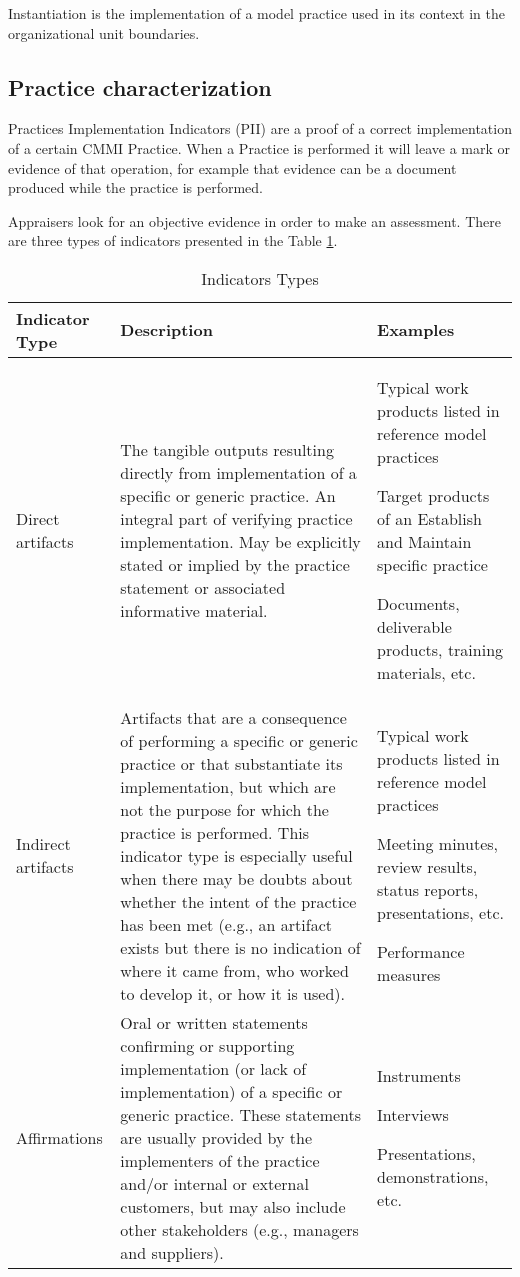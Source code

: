 Instantiation is the implementation of a model practice used in its context in the organizational unit boundaries.

\subsection{Practice characterization}
Practices Implementation Indicators (PII) are a proof of  a correct implementation of a certain CMMI Practice. When a Practice is performed it will leave a mark or evidence of that operation, for example that evidence can be a document produced while the practice is performed.

Appraisers look for an objective evidence in order to make an assessment. There are three types of indicators presented in the Table \ref{tab:Indicator}.


\begin{table}[h]
	\centering
	\caption{Indicators Types}
	\begin{tabular}{|p{2cm}|p{7cm}|p{4cm}|}
		\hline Indicator Type & Description & Examples\\
		\hline Direct artifacts & The tangible outputs resulting directly 
		from implementation of a specific or 
		generic practice. An integral part of 
		verifying practice implementation. May 
		be explicitly stated or implied by the 
		practice statement or associated 
		informative material. & Typical work products listed 
		in reference model practices 
		
		Target products of an 
		Establish and Maintain specific practice 
		
		Documents, deliverable 
		products, training materials, 
		etc. \\ 
		\hline Indirect artifacts & Artifacts that are a consequence of 
		performing a specific or generic practice 
		or that substantiate its implementation, 
		but which are not the purpose for which 
		the practice is performed. This indicator 
		type is especially useful when there may 
		be doubts about whether the intent of the 
		practice has been met (e.g., an artifact 
		exists but there is no indication of where 
		it came from, who worked to develop it, 
		or how it is used).  & Typical work products listed 
		in reference model practices 
		
		Meeting minutes, review 
		results, status reports, 
		presentations, etc. 
		
		Performance measures \\ 
		\hline Affirmations & Oral or written statements confirming or 
		supporting implementation (or lack of 
		implementation) of a specific or generic 
		practice. These statements are usually 
		provided by the implementers of the 
		practice and/or internal or external 
		customers, but may also include other 
		stakeholders (e.g., managers and 
		suppliers). &  Instruments 
		
		Interviews 
		
		Presentations, 
		demonstrations, etc.\\ 
		\hline 
	\end{tabular}
	\label{tab:Indicator}
\end{table}


